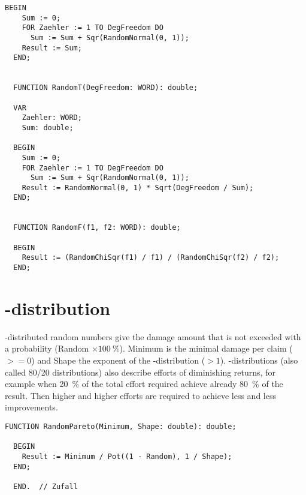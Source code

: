 \begin{refsection}
\begin{lstlisting}[caption=Distribution for decission statistics]
  BEGIN
    Sum := 0;
    FOR Zaehler := 1 TO DegFreedom DO
      Sum := Sum + Sqr(RandomNormal(0, 1));
    Result := Sum;
  END;


  FUNCTION RandomT(DegFreedom: WORD): double;

  VAR
    Zaehler: WORD;
    Sum: double;

  BEGIN
    Sum := 0;
    FOR Zaehler := 1 TO DegFreedom DO
      Sum := Sum + Sqr(RandomNormal(0, 1));
    Result := RandomNormal(0, 1) * Sqrt(DegFreedom / Sum);
  END;


  FUNCTION RandomF(f1, f2: WORD): double;

  BEGIN
    Result := (RandomChiSqr(f1) / f1) / (RandomChiSqr(f2) / f2);
  END;
\end{lstlisting}

\section{-distribution}

-distributed random numbers give the damage amount that is not exceeded with a probability (Random \(\times \SI{100}{\%} \)).   Minimum is the minimal damage per claim (\( >= 0 \)) and Shape the exponent of the -distribution (\( > 1 \)). -distributions (also called 80/20 distributions) also describe efforts of diminishing returns, for example when \SI{20}{\%} of the total effort required achieve already \SI{80}{\%} of the result. Then higher and higher efforts are required to achieve less and less improvements.
\begin{lstlisting}[caption=Pareto]
  FUNCTION RandomPareto(Minimum, Shape: double): double;

  BEGIN
    Result := Minimum / Pot((1 - Random), 1 / Shape);
  END;

  END.  // Zufall
\end{lstlisting}


\printbibliography[heading=subbibliography]
\end{refsection}

